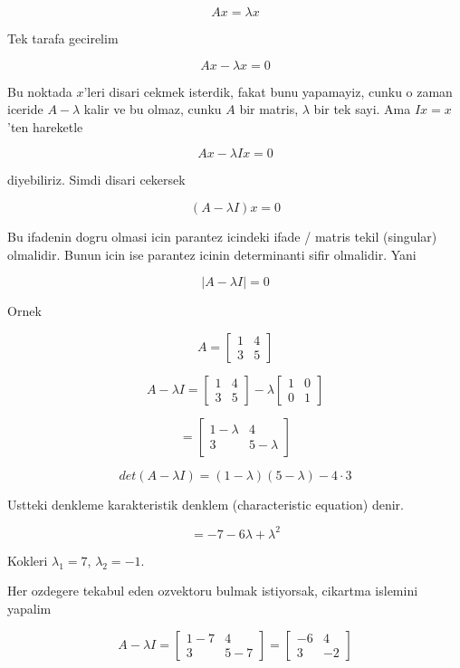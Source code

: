 \documentclass[12pt,fleqn]{article}\usepackage{../common}
\begin{document}
\[ Ax = \lambda x \]

Tek tarafa gecirelim

\[ Ax - \lambda x = 0 \]

Bu noktada $x$'leri disari cekmek isterdik, fakat bunu yapamayiz, cunku o
zaman iceride $A - \lambda$ kalir ve bu olmaz, cunku $A$ bir matris,
$\lambda$ bir tek sayi. Ama $Ix = x$'ten hareketle

\[ Ax - \lambda I x = 0 \]

diyebiliriz. Simdi disari cekersek

\[ (A - \lambda I) x = 0 \]

Bu ifadenin dogru olmasi icin parantez icindeki ifade / matris tekil
(singular) olmalidir. Bunun icin ise parantez icinin determinanti sifir
olmalidir. Yani

\[ |A - \lambda I| = 0 \]

Ornek 

\[ 
A = 
\left[\begin{array}{rr}
1 & 4 \\ 3 & 5
\end{array}\right]
 \]

\[ 
A - \lambda I = 
\left[\begin{array}{rr}
1 & 4 \\ 3 & 5
\end{array}\right] - 
\lambda
\left[\begin{array}{rr}
1 & 0 \\ 0 & 1
\end{array}\right] 
 \]

\[ 
= 
\left[\begin{array}{rr}
1 - \lambda & 4 \\ 3 & 5-\lambda
\end{array}\right]
 \]

\[ det(A - \lambda I) = (1-\lambda)(5-\lambda) - 4 \cdot 3 \]

Ustteki denkleme karakteristik denklem (characteristic equation) denir. 

\[ = -7 -6\lambda + \lambda^2 \]

Kokleri $\lambda_1 = 7$, $\lambda_2 = -1$.

Her ozdegere tekabul eden ozvektoru bulmak istiyorsak, cikartma islemini
yapalim

\[ 
A - \lambda I = 
\left[\begin{array}{rr}
1-7 & 4 \\ 3 & 5-7
\end{array}\right] = 
\left[\begin{array}{rr}
-6 & 4 \\ 3 & -2
\end{array}\right]
 \]
\end{document}
